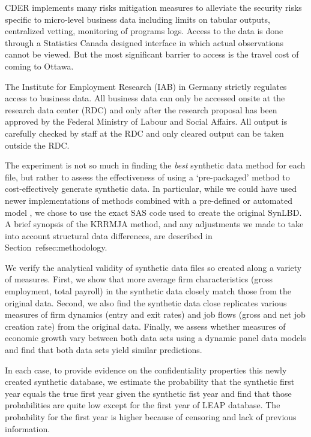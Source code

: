 CDER implements many risks mitigation measures to alleviate the security risks specific to micro-level business data including limits on tabular outputs, centralized vetting, monitoring of programs logs. Access to the data is done through a Statistics Canada designed interface in which actual observations cannot be viewed. But the most significant barrier to access is the travel cost of coming to Ottawa.

The Institute for Employment Research (IAB) in Germany strictly regulates access to business data. All business data can only be accessed onsite at the research data center (RDC) and only after the research proposal has been approved by the Federal Ministry of Labour and Social Affairs. All output is carefully checked by staff at the RDC and only cleared output can be taken outside the RDC. 

The experiment is not so much in finding the \textit{best} synthetic data method for each file, but rather to assess the effectiveness of using a `pre-packaged' method to cost-effectively generate synthetic data. In particular, while we could have used newer implementations of methods combined with a pre-defined or automated model \citep{JSSv074i11,Raab_Nowok_Dibben_2018}, we chose to use the exact SAS code used to create the original \ac{SynLBD}. A brief synopsis of the KRRMJA method, and any adjustments we made to take into account structural data differences, are described in Section~ref{sec:methodology}.



We verify the analytical validity of synthetic data files so created along a variety of measures. First, we show that more average firm characteristics (gross employment, total payroll) in the synthetic data closely match those from the original data. Second, we also find the synthetic data close replicates various measures of firm dynamics (entry and exit rates) and job flows (gross and net job creation rate) from the original data. Finally, we assess whether measures of economic growth vary between both data sets using a dynamic panel data models and find that both data sets yield similar predictions.

In each case, to provide evidence on the confidentiality properties this newly created  synthetic database, we estimate the probability that the synthetic first year equals the true first year given the synthetic fist year and find that those probabilities are quite low except for the first year of LEAP database. The probability for the first year is higher because of censoring and lack of previous information.

